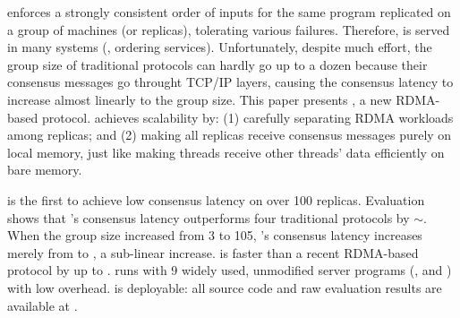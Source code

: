 


\paxos enforces a strongly consistent order of inputs for the same program 
replicated on a group of machines (or replicas), tolerating various failures. 
Therefore, \paxos is served in many systems (\eg, ordering services). 
Unfortunately, despite much effort, the group size of traditional \paxos 
protocols can hardly go up to a dozen because their consensus messages 
go throught TCP/IP layers, causing the consensus latency to increase almost 
linearly to the group size. This paper presents \xxx, a new RDMA-based \paxos 
protocol. \xxx achieves scalability by: (1) carefully separating RDMA workloads 
among replicas; and (2) making all replicas receive consensus messages purely on 
local memory, just like making threads receive other threads' data efficiently 
on bare memory.

\xxx is the first to achieve low \paxos consensus latency on over 100 replicas. 
Evaluation shows that \xxx's consensus latency outperforms four 
traditional \paxos protocols by \comptradlow$\sim$\comptradhigh. When 
the group size increased from 3 to 105, \xxx's consensus latency 
increases merely from \xxxlatencythree \us to \xxxlatencyonezerofive \us, a 
sub-linear increase. \xxx is faster than a recent RDMA-based \paxos protocol by 
up to \fasterDARE. \xxx runs with 9 widely used, unmodified server programs 
(\eg, \redis and \mysql) with low overhead. \xxx is deployable: all source 
code and raw evaluation results are available at \github.

